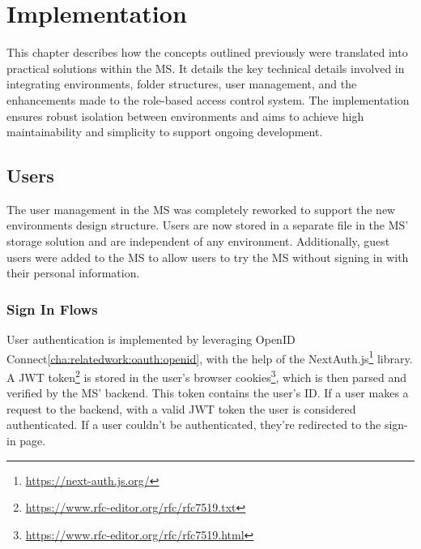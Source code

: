 \chapter{Implementation}
\label{cha:implementation}

This chapter describes how the concepts outlined previously were translated into practical solutions within the MS.
It details the key technical details involved in integrating environments,
folder structures,
user management,
and the enhancements made to the role-based access control system.
The implementation ensures robust isolation between environments and 
aims to achieve high maintainability and simplicity to support ongoing development.


\section{Users}

The user management in the MS was completely reworked to support the new 
environments design structure.
Users are now stored in a separate file in the MS' storage solution and are independent of
any environment.
Additionally, guest users were added to the MS to allow users to try the MS without
signing in with their personal information.

%

\subsection{Sign In Flows}

User authentication is implemented by leveraging OpenID Connect\ref{cha:relatedwork:oauth:openid},
with the help of the NextAuth.js\footnote{\url{https://next-auth.js.org/}} library.
A JWT token\footnote{\url{https://www.rfc-editor.org/rfc/rfc7519.txt}}
is stored in the user's browser cookies\footnote{\url{https://www.rfc-editor.org/rfc/rfc7519.html}},
which is then parsed and verified by the MS' backend.
This token contains the user's ID.
If a user makes a request to the backend,
with a valid JWT token the user is considered authenticated.
If a user couldn't be authenticated, they're redirected to the sign-in page.

